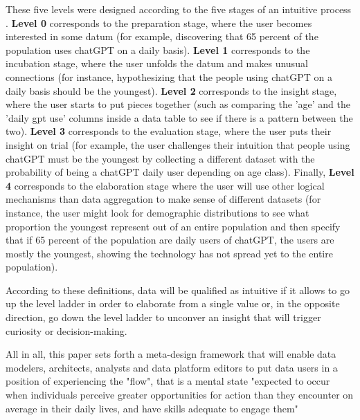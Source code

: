 \documentclass[12pt,a4paper]{article}
\begin{document}
\noindent These five levels were designed according to the five stages of an intuitive process \citep{csikszentmihalyi1997flow}. \textbf{Level 0} corresponds to the preparation stage, where the user becomes interested in some datum (for example, discovering that 65 percent of the population uses chatGPT on a daily basis). \textbf{Level 1} corresponds to the incubation stage, where the user unfolds the datum and makes unusual connections (for instance, hypothesizing that the people using chatGPT on a daily basis should be the youngest). \textbf{Level 2} corresponds to the insight stage, where the user starts to put pieces together (such as comparing the 'age' and the 'daily gpt use' columns inside a data table to see if there is a pattern between the two). \textbf{Level 3} corresponds to the evaluation stage, where the user puts their insight on trial (for example, the user challenges their intuition that people using chatGPT must be the youngest by collecting a different dataset with the probability of being a chatGPT daily user depending on age class). Finally, \textbf{Level 4} corresponds to the elaboration stage where the user will use other logical mechanisms than data aggregation to make sense of different datasets (for instance, the user might look for demographic distributions to see what proportion the youngest represent out of an entire population and then specify that if 65 percent of the population are daily users of chatGPT, the users are mostly the youngest, showing the technology has not spread yet to the entire population).

\vspace{1em}

\noindent According to these definitions, data will be qualified as intuitive if it allows to go up the level ladder in order to elaborate from a single value or, in the opposite direction, go down the level ladder to unconver an insight that will trigger curiosity or decision-making. 

\vspace{1em}

\noindent All in all, this paper sets forth a meta-design framework that will enable data modelers, architects, analysts and data platform editors to put data users in a position of experiencing the "flow", that is a mental state "expected to occur when individuals perceive greater opportunities for action than they encounter on average in
their daily lives, and have skills adequate to engage them" \citep{nakamura2014concept}


\end{document}
